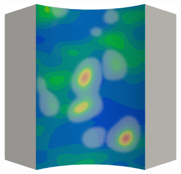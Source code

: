 \begin{frame}
\begin{columns}[T]
\begin{column}{0.6\textwidth}
\begin{figure}
{\begin{subfigure}{0.19\textwidth}
          \end{subfigure}
          \hspace{0.06\textwidth}
          \begin{subfigure}{0.19\textwidth}
            \centering
            \includegraphics[width=\textwidth]{Chapter345/figures/ep.0012}
          \end{subfigure}
        }
        

\end{figure}
\end{column}
\end{columns}
\end{frame}
